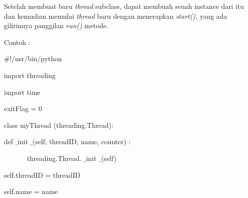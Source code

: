 \documentclass[a4paper,12pt]{report}
\begin{document}
 \par
\begin{adjustwidth}{0.25in}{-0.5in}
Setelah membuat baru \textit{thread} subclass, dapat membuah seuah instance dari itu dan kemudian memulai \textit{thread} baru dengan menerapkan \textit{start(),} yang ada gilirinnya panggilan \textit{run()} metode.\end{adjustwidth}
 \par
\vspace{12pt}
\begin{adjustwidth}{0.25in}{-0.5in}
Contoh :\end{adjustwidth}
 \par
\noindent 
{\fontsize{10pt}{10pt}\selectfont  $  \#  $!/usr/bin/python} \par
\vspace{10pt}
\noindent 
{\fontsize{10pt}{10pt}\selectfont import threading} \par
\noindent 
{\fontsize{10pt}{10pt}\selectfont import time} \par
\vspace{10pt}
\noindent 
{\fontsize{10pt}{10pt}\selectfont exitFlag = 0} \par
\vspace{10pt}
\noindent 
{\fontsize{10pt}{10pt}\selectfont class myThread (threading.Thread):} \par
\noindent 
{\fontsize{10pt}{10pt}\selectfont  \hspace*{0.5in} def $  \_  $init $  \_  $(self, threadID, name, counter) :} \par
\noindent 
{\fontsize{10pt}{10pt}\selectfont ~~~~~~ threading.Thread. $  \_  $init $  \_  $(self)} \par
\noindent 
{\fontsize{10pt}{10pt}\selectfont  \hspace*{0.5in} self.threadID = threadID} \par
\noindent 
{\fontsize{10pt}{10pt}\selectfont  \hspace*{0.5in} self.name = name} \par
\vspace{10pt}
\vspace{10pt}
\vspace{10pt}
\noindent 




\newpage
\end{document}
